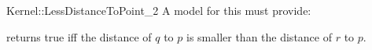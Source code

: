 \begin{ccRefFunctionObjectConcept}{Kernel::LessDistanceToPoint_2}
A model for this must provide:


{returns true iff the distance of $q$ to $p$ is
smaller than the distance of $r$ to $p$.}

\ccSeeAlso
{}\\

\end{ccRefFunctionObjectConcept}

